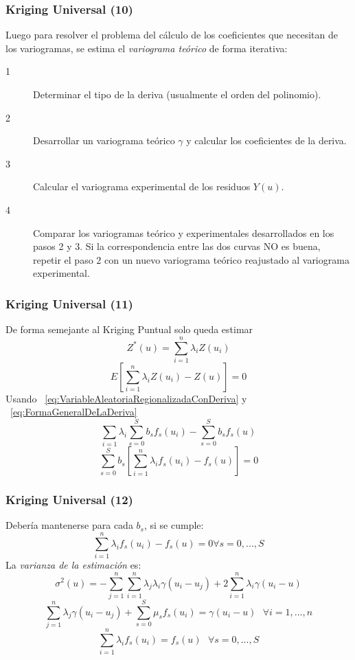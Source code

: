 \documentclass{beamer}
\begin{document}
\begin{frame}
\frametitle{Kriging Universal (10)}
Luego para resolver el problema del cálculo de los coeficientes que necesitan de los variogramas, se estima el  \emph{variograma teórico} de forma iterativa:
\begin{description}
\item[1] Determinar el tipo de la deriva (usualmente el orden del polinomio).
\item[2] Desarrollar un variograma teórico $\gamma$ y calcular los coeficientes de la deriva.
\item[3] Calcular el variograma experimental de los residuos $Y(u)$.
\item[4] Comparar los variogramas teórico y experimentales desarrollados en los pasos 2 y 3. Si la correspondencia entre las dos curvas NO es buena, repetir el paso 2 con un nuevo variograma teórico reajustado al variograma experimental.
\end{description}
\end{frame}

\begin{frame}
\frametitle{Kriging Universal (11)}
De forma semejante al Kriging Puntual solo queda estimar
\begin{equation}
Z^*(u) = \sum_{i=1}^n \lambda_i Z(u_i)
\end{equation}
\begin{equation}
E\left[\sum_{i=1}^n \lambda_i Z(u_i) - Z(u)\right]=0
\end{equation}
Usando ~\ref{eq:VariableAleatoriaRegionalizadaConDeriva} y ~\ref{eq:FormaGeneralDeLaDeriva}
\begin{equation}
\sum_{i=1} \lambda_i \sum_{s=0}^S b_s f_s(u_i) - \sum_{s=0}^S b_s f_s(u)
\end{equation}
\begin{equation}
\sum_{s=0}^S b_s \left[ \sum_{i=1}^n \lambda_i f_s(u_i) - f_s(u) \right] = 0
\end{equation}
\end{frame}

\begin{frame}
\frametitle{Kriging Universal (12)}
Debería mantenerse para cada $b_s$, si se cumple:
\begin{equation}
\sum_{i=1}^n \lambda_i f_s(u_i) - f_s(u) = 0 \forall s = 0,...,S
\end{equation}
La \emph{varianza de la estimación} es:
\begin{equation}
\sigma^2(u) = - \sum_{j=1}^n \sum_{i=1}^n \lambda_j \lambda_i \gamma(u_i - u_j) + 2 \sum_{i=1}^n \lambda_i \gamma(u_i -u)
\end{equation}
\begin{equation}
\sum_{j=1}^n \lambda_j \gamma(u_i - u_j) + \sum_{s=0}^S \mu_s f_s(u_i) = \gamma(u_i - u) \textit{ } \forall i = 1,...,n
\end{equation}
\begin{equation}
\sum_{i=1}^n \lambda_i f_s(u_i) = f_s(u) \textit{ } \forall s = 0,...,S
\end{equation}
\end{frame}
\end{document}

